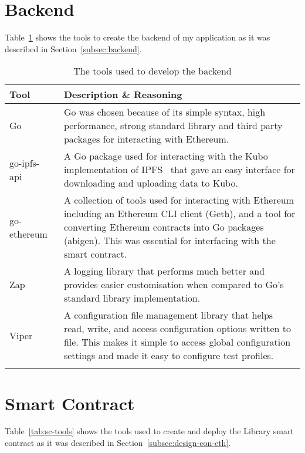 
\section{Backend}

Table~\ref{tab:backend-tools} shows the tools to create the backend of my application as it was described in Section~\ref{subsec:backend}.

\begin{longtable}{p{} p{}}
  \toprule
  \textbf{Tool} & \textbf{Description \& Reasoning}
  \\\midrule\midrule
  Go~\cite{noauthor_go_nodate}
  & \small Go was chosen because of its simple syntax, high performance, strong standard library and third party packages for interacting with Ethereum.
  \\
  go-ipfs-api~\cite{noauthor_go-ipfs-api_2023}
  & \small A Go package used for interacting with the Kubo implementation of IPFS~\cite{noauthor_ipfskubo_2023} that gave an easy interface for downloading and uploading data to Kubo.\\
  go-ethereum~\cite{noauthor_go-ethereum_nodate}
  & \small A collection of tools used for interacting with Ethereum including an Ethereum CLI client (Geth), and a tool for converting Ethereum contracts into Go packages (abigen). This was essential for interfacing with the smart contract.\\
  Zap~\cite{noauthor_zap_2023}
  & \small A logging library that performs much better and provides easier customisation when compared to Go's standard library implementation. \\
  Viper~\cite{noauthor_viper_nodate}
  & \small A configuration file management library that helps read, write, and access configuration options written to file. This makes it simple to access global configuration settings and made it easy to configure test profiles.
  \\\bottomrule\bottomrule
  \caption{The tools used to develop the backend}
  \label{tab:backend-tools}
\end{longtable}

\section{Smart Contract}\label{sec:impl-deploy}

Table~\ref{tab:sc-tools} shows the tools used to create and deploy the Library smart contract as it was described in Section~\ref{subsec:design-con-eth}.

